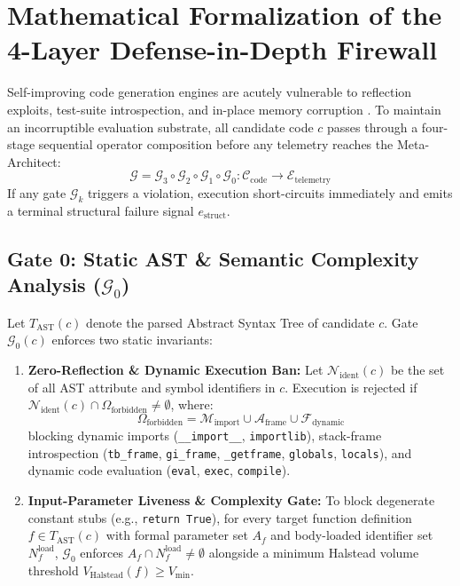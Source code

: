 \documentclass[10pt,twocolumn,letterpaper]{article}
\begin{document}
\section{Mathematical Formalization of the 4-Layer Defense-in-Depth Firewall}
Self-improving code generation engines are acutely vulnerable to reflection exploits, test-suite introspection, and in-place memory corruption \cite{robeyns2025}. To maintain an incorruptible evaluation substrate, all candidate code $c$ passes through a four-stage sequential operator composition before any telemetry reaches the Meta-Architect:
\begin{equation}
\mathcal{G} = \mathcal{G}_{3}\circ\mathcal{G}_{2}\circ\mathcal{G}_{1}\circ\mathcal{G}_{0} : \mathcal{C}_{\text{code}}\to\mathcal{E}_{\text{telemetry}}
\end{equation}
If any gate $\mathcal{G}_{k}$ triggers a violation, execution short-circuits immediately and emits a terminal structural failure signal $e_{\text{struct}}$.

\subsection{Gate 0: Static AST \& Semantic Complexity Analysis ($\mathcal{G}_{0}$)}
Let $T_{\text{AST}}(c)$ denote the parsed Abstract Syntax Tree of candidate $c$. Gate $\mathcal{G}_{0}(c)$ enforces two static invariants:
\begin{enumerate}
    \item \textbf{Zero-Reflection \& Dynamic Execution Ban:} Let $\mathcal{N}_{\text{ident}}(c)$ be the set of all AST attribute and symbol identifiers in $c$. Execution is rejected if $\mathcal{N}_{\text{ident}}(c)\cap\Omega_{\text{forbidden}}\neq\emptyset$, where:
    \begin{equation}
    \Omega_{\text{forbidden}} = \mathcal{M}_{\text{import}}\cup\mathcal{A}_{\text{frame}}\cup\mathcal{F}_{\text{dynamic}}
    \end{equation}
    blocking dynamic imports (\texttt{\_\_import\_\_}, \texttt{importlib}), stack-frame introspection (\texttt{tb\_frame}, \texttt{gi\_frame}, \texttt{\_getframe}, \texttt{globals}, \texttt{locals}), and dynamic code evaluation (\texttt{eval}, \texttt{exec}, \texttt{compile}).
    \item \textbf{Input-Parameter Liveness \& Complexity Gate:} To block degenerate constant stubs (e.g., \texttt{return True}), for every target function definition $f\in T_{\text{AST}}(c)$ with formal parameter set $A_{f}$ and body-loaded identifier set $N_{f}^{\text{load}}$, $\mathcal{G}_{0}$ enforces $A_{f}\cap N_{f}^{\text{load}}\neq\emptyset$ alongside a minimum Halstead volume threshold $V_{\text{Halstead}}(f)\ge V_{\min}$.
\end{enumerate}
\end{document}
